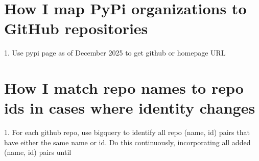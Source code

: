 \documentclass[12pt,notitlepage]{article}
\begin{document}
\section{How I map PyPi organizations to GitHub repositories}
1. Use pypi page as of December 2025 to get github or homepage URL
\section{How I match repo names to repo ids in cases where identity changes}
1. For each github repo, use bigquery to identify all repo (name, id) pairs that have either the same name or id.
Do this continuously, incorporating all added (name, id) pairs until
\end{document}
